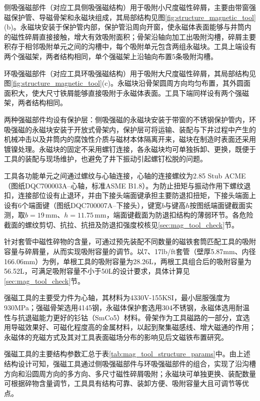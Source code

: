 侧吸强磁部件（对应工具侧吸强磁结构）用于吸附小尺度磁性碎屑，主要由带窗强磁保护管、导磁骨架和永磁块组成，其局部结构见图\ref{fig:structure_magnetic_tool}(b)。永磁块安装于保护管内部，保护管沿周向开窗，使永磁体表面能够与井筒内的磁性碎屑直接接触，增大有效吸附面积；骨架沿轴向加工出吸附沟槽，碎屑主要积存于相邻吸附单元之间的沟槽中，每个吸附单元包含两组永磁块。工具上端设有两个强磁架，两者结构相同，单个强磁架上沿轴向布置5条吸附沟槽。

环吸强磁部件（对应工具环吸强磁结构）用于吸附大尺度磁性碎屑，其局部结构见图\ref{fig:structure_magnetic_tool}(c)。永磁块沿骨架圆周方向均匀布置，其外圆面面积大，使大尺寸铁屑能够直接吸附于永磁体表面。工具下端同样设有两个强磁架，两者结构相同。

两种强磁部件均设有保护层：侧吸强磁的永磁块安装于带窗的不锈钢保护管内，环吸强磁的永磁块安装于开放式骨架内，保护层可将运输、装配与下井过程中产生的机械冲击以及井筒内的腐蚀性介质与磁材本体隔离开来，磁块在制造时表面还采用镀镍处理。永磁块的固定不采用螺钉连接，各永磁块均可单独拆卸、更换，既便于工具的装配与现场维护，也避免了井下振动引起螺钉松脱的问题。

工具各功能单元之间通过螺纹与心轴连接，心轴的连接螺纹为2.85 Stub ACME（图纸DQC700003A--心轴，标准ASME B1.8）。为防止扭矩与振动作用下螺纹退扣，连接部位设有止退环，并由下接头端面键承担主要防退扣扭矩，下接头端面上设有6个端面键（图纸DQC700007A--下接头），键宽$b$与键高$h$按图纸端面键截面实测，取$b=19\,\text{mm}$、$h=11.75\,\text{mm}$，端面键截面为防退扣结构的薄弱环节。各危险截面的螺纹剪切、抗拉、抗扭及防退扣强度校核见\ref{sec:mag_tool_check}节。

针对套管中磁性碎物的含量，可通过预先装配不同数量的磁铁套筒匹配工具的吸附容量与碎屑量，从而实现吸附容量的调节。以7\inch、17lb/ft套管（壁厚5.87mm、内径166.06mm）为例，单根工具的吸附容量为28.26L，两根工具组合后的吸附容量为56.52L，可满足吸附容量不小于50L的设计要求，具体计算见\ref{sec:mag_tool_check}节。

强磁工具的主要受力件为心轴，其材料为4330V-155KSI，最小屈服强度为930MPa；强磁骨架选用4145钢，永磁体保护套选用304不锈钢，永磁体选用耐温性与抗退磁能力更好的钐钴（SmCo5）材料。骨架作为工具磁路的一部分，宜选用导磁效果好、可磁化程度高的金属材料，以起到聚集磁感线、增大磁通的作用；永磁体的充磁方式及其对工具表面磁场分布的影响见后文磁铁布置研究。

强磁工具的主要结构参数汇总于表\ref{tab:mag_tool_structure_params}中。由上述结构设计可知，强磁工具通过侧吸强磁部件与环吸强磁部件的组合，实现了沿沟槽方向和沿圆周方向的多方向、多尺寸磁性碎屑吸附；永磁块可单独更换、装配数量可根据碎物含量调节，工具具有结构可靠、装卸方便、吸附容量大且可调节等优点。

